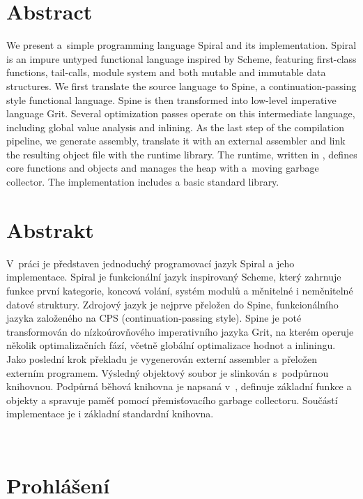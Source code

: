 \begin{adjustwidth}{1.5cm}{1.5cm}

\section*{Abstract}

We present a~simple programming language Spiral and its implementation. Spiral
is an impure untyped functional language inspired by Scheme, featuring
first-class functions, tail-calls, module system and both mutable and immutable
data structures. We first translate the source language to Spine, a
continuation-passing style functional language. Spine is then transformed into
low-level imperative language Grit. Several optimization passes operate on this
intermediate language, including global value analysis and inlining. As the last
step of the compilation pipeline, we generate assembly, translate it with an
external assembler and link the resulting object file with the runtime library.
The runtime, written in \Cplusplus, defines core functions and objects and
manages the heap with a~moving garbage collector. The implementation includes a
basic standard library.

\section*{Abstrakt}

V~práci je představen jednoduchý programovací jazyk Spiral a jeho implementace.
Spiral je funkcionální jazyk inspirovaný Scheme, který zahrnuje funkce první
kategorie, koncová volání, systém modulů a měnitelné i neměnitelné datové
struktury. Zdrojový jazyk je nejprve přeložen do Spine, funkcionálního jazyka
založeného na CPS (continuation-passing style). Spine je poté transformován do
nízkoúrovňového imperativního jazyka Grit, na kterém operuje několik
optimalizačních fází, včetně globální optimalizace hodnot a inliningu.  Jako
poslední krok překladu je vygenerován externí assembler a přeložen externím
programem.  Výsledný objektový soubor je slinkován s~podpůrnou knihovnou.
Podpůrná běhová knihovna je napsaná v~\Cplusplus, definuje základní funkce a
objekty a spravuje paměť pomocí přemisťovacího garbage collectoru. Součástí
implementace je i základní standardní knihovna.

\end{adjustwidth}

\newpage

~\\[7cm]
\section*{Prohlášení}

